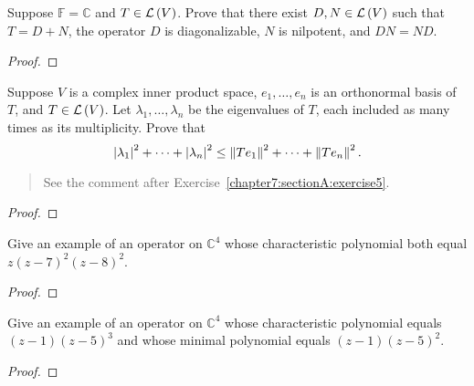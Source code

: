 \begin{exercise}\label{chapter8:sectionB:exercise9}
    Suppose $\mathbb{F} = \mathbb{C}$ and $T\in\mathcal{L}\left({V}\right)$. Prove that there exist $D, N\in \mathcal{L}\left({V}\right)$ such that $T = D + N$, the operator $D$ is diagonalizable, $N$ is nilpotent, and $DN = ND$.
\end{exercise}

\begin{proof}
\end{proof}
\newpage

\begin{exercise}\label{chapter8:sectionB:exercise10}
    Suppose $V$ is a complex inner product space, $e_{1}, \ldots, e_{n}$ is an orthonormal basis of $T$, and $T \in \mathcal{L}\left({V}\right)$. Let $\lambda_{1}, \ldots, \lambda_{n}$ be the eigenvalues of $T$, each included as many times as its multiplicity. Prove that
    \[
        \left\vert{\lambda_{1}}\right\vert^{2} + \cdots + \left\vert{\lambda_{n}}\right\vert^{2} \leq \left\Vert{Te_{1}}\right\Vert^{2} + \cdots + \left\Vert{Te_{n}}\right\Vert^{2}.
    \]
\end{exercise}

\begin{quote}
    See the comment after Exercise~\ref{chapter7:sectionA:exercise5}.
\end{quote}

\begin{proof}
\end{proof}
\newpage

\begin{exercise}\label{chapter8:sectionB:exercise11}
    Give an example of an operator on $\mathbb{C}^{4}$ whose characteristic polynomial both equal $z{(z - 7)}^{2}{(z - 8)}^{2}$.
\end{exercise}

\begin{proof}
\end{proof}
\newpage

\begin{exercise}\label{chapter8:sectionB:exercise12}
    Give an example of an operator on $\mathbb{C}^{4}$ whose characteristic polynomial equals $(z - 1){(z - 5)}^{3}$ and whose minimal polynomial equals $(z - 1){(z - 5)}^{2}$.
\end{exercise}

\begin{proof}
\end{proof}
\newpage

